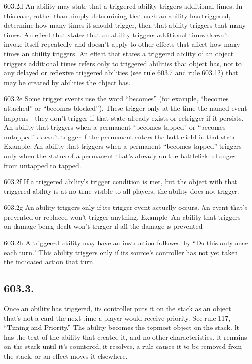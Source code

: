 603.2d An ability may state that a triggered ability triggers additional times. In this case, rather than simply determining that such an ability has triggered, determine how many times it should trigger, then that ability triggers that many times. An effect that states that an ability triggers additional times doesn’t invoke itself repeatedly and doesn’t apply to other effects that affect how many times an ability triggers. An effect that states a triggered ability of an object triggers additional times refers only to triggered abilities that object has, not to any delayed or reflexive triggered abilities (see rule 603.7 and rule 603.12) that may be created by abilities the object has.

603.2e Some trigger events use the word “becomes” (for example, “becomes attached” or “becomes blocked”). These trigger only at the time the named event happens—they don’t trigger if that state already exists or retrigger if it persists. An ability that triggers when a permanent “becomes tapped” or “becomes untapped” doesn’t trigger if the permanent enters the battlefield in that state.
Example: An ability that triggers when a permanent “becomes tapped” triggers only when the status of a permanent that’s already on the battlefield changes from untapped to tapped.

603.2f If a triggered ability’s trigger condition is met, but the object with that triggered ability is at no time visible to all players, the ability does not trigger.

603.2g An ability triggers only if its trigger event actually occurs. An event that’s prevented or replaced won’t trigger anything.
Example: An ability that triggers on damage being dealt won’t trigger if all the damage is prevented.

603.2h A triggered ability may have an instruction followed by “Do this only once each turn.” This ability triggers only if its source’s controller has not yet taken the indicated action that turn.

\subsection*{603.3.}
Once an ability has triggered, its controller puts it on the stack as an object that’s not a card the next time a player would receive priority. See rule 117, “Timing and Priority.” The ability becomes the topmost object on the stack. It has the text of the ability that created it, and no other characteristics. It remains on the stack until it’s countered, it resolves, a rule causes it to be removed from the stack, or an effect moves it elsewhere.

